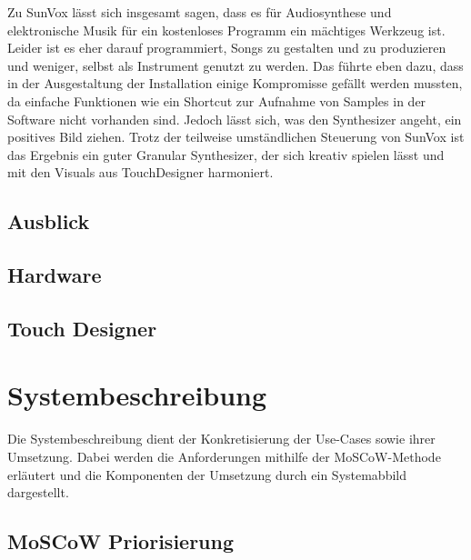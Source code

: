 \documentclass[12pt]{scrartcl}%
\theoremstyle{nonumberplain}
\begin{document}
Zu SunVox lässt sich insgesamt sagen, dass es für Audiosynthese und elektronische Musik für ein kostenloses Programm ein mächtiges Werkzeug ist. Leider ist es eher darauf programmiert, Songs zu gestalten und zu produzieren und weniger, selbst als Instrument genutzt zu werden. Das führte eben dazu, dass in der Ausgestaltung der Installation einige Kompromisse gefällt werden mussten, da einfache Funktionen wie ein Shortcut zur Aufnahme von Samples in der Software nicht vorhanden sind. Jedoch lässt sich, was den Synthesizer angeht, ein positives Bild ziehen. Trotz der teilweise umständlichen Steuerung von SunVox ist das Ergebnis ein guter Granular Synthesizer, der sich kreativ spielen lässt und mit den Visuals aus TouchDesigner harmoniert.

\subsection{Ausblick}

\subsection{Hardware}

\subsection{Touch Designer}

\section{Systembeschreibung}

Die Systembeschreibung dient der Konkretisierung der Use-Cases sowie ihrer Umsetzung. Dabei werden die Anforderungen mithilfe der MoSCoW-Methode erläutert und die Komponenten der Umsetzung durch ein Systemabbild dargestellt.

\subsection{MoSCoW Priorisierung}
\end{document}
